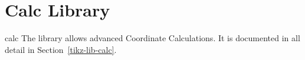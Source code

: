 
\section[library-calc]{Calc Library}

\begin{tikzlibrary}{calc}
    The library allows advanced Coordinate Calculations. It is documented in
    all detail in Section~\ref{tikz-lib-calc}.
\end{tikzlibrary}
